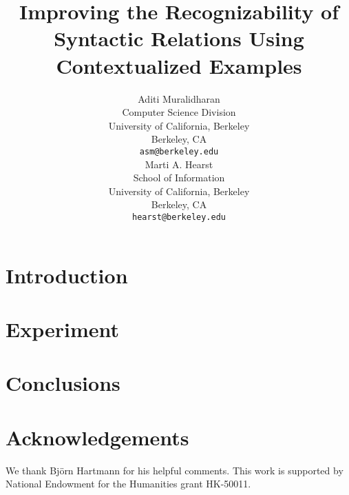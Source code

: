 \documentclass[11pt]{article}
\title{Improving the Recognizability of Syntactic Relations Using Contextualized Examples}
\author{Aditi Muralidharan \\
  Computer Science Division \\
  University of California, Berkeley \\
  Berkeley, CA\\
  {\tt asm@berkeley.edu} \\\And
  Marti A. Hearst \\
  School of Information \\
  University of California, Berkeley \\
  Berkeley, CA \\
  {\tt hearst@berkeley.edu} \\}
\begin{document}
\maketitle

\begin{abstract}

\end{abstract}



\section{Introduction}


\section{Experiment}


\section{Conclusions}


\section{Acknowledgements}

We thank Bj{\"o}rn Hartmann for his helpful comments. This work is supported by National Endowment for the Humanities grant HK-50011.



\end{document}
